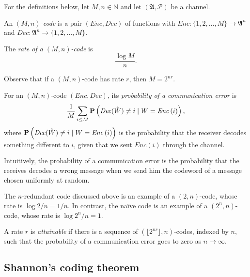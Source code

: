 For the definitions below, let $M, n \in \mathbb{N}$ and let $(\mathfrak{A}, \mathcal{P})$ be a channel.

\begin{definition}
An \emph{$(M, n)$-code} is a pair $(\mathit{Enc}, \mathit{Dec})$ of functions with $\mathit{Enc}: \{1, 2, \ldots, M\} \to \mathfrak{A}^n$ and $\mathit{Dec}: \mathfrak{A}^n \to \{1, 2, \ldots, M\}$.
\end{definition}

\begin{definition}
The \emph{rate of a $(M, n)$-code} is 
%
$$\frac{\log M}{n}.$$
%
\end{definition}

Observe that if a $(M, n)$-code has rate $r$, then $M = 2^{nr}$.

\begin{definition}
For an $(M, n)$-code $(\mathit{Enc}, \mathit{Dec})$,
its \emph{probability of a communication error} is
%
$$\frac{1}{M}\sum_{i \leq M} \mathbf{P}\left(\mathit{Dec}(\hat{W}) \neq i \mid W = \mathit{Enc}\left(i\right)\right),$$
%
where $\mathbf{P}\left(\mathit{Dec}(\hat{W}) \neq i \mid W = \mathit{Enc}\left(i\right)\right)$ is the probability that the receiver decodes something different to $i$, given that we sent $\mathit{Enc}\left(i\right)$ through the channel.
\end{definition}

Intuitively, the probability of a communication error is the probability that the receives decodes a wrong message when we send him the codeword of a message chosen uniformly at random.

\begin{example}
The $n$-redundant code discussed above is an example of a $(2, n)$-code, whose rate is $\log 2 / n = 1/n$. In contrast, the na\"ive code is an example of a $(2^n, n)$-code, whose rate is $\log 2^n / n = 1$.
\end{example}

\begin{definition}
A rate $r$ is \emph{attainable} if there is a sequence of $\left(\lfloor2^{nr}\rfloor, n\right)$-codes, indexed by $n$, such that the probability of a communication error goes to zero as $n \to \infty$.
\end{definition}

\subsection{Shannon's coding theorem}

